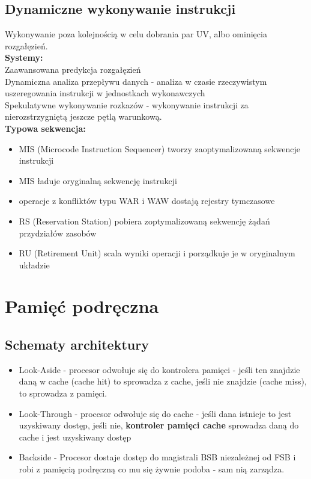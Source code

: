 \documentclass[a4paper]{article}
\begin{document}
\subsection{Dynamiczne wykonywanie instrukcji}
Wykonywanie poza kolejnością w celu dobrania par UV, albo ominięcia rozgałęzień.\\
\textbf{Systemy:}\\
Zaawansowana predykcja rozgałęzień\\
Dynamiczna analiza przepływu danych - analiza w czasie rzeczywistym uszeregowania instrukcji w jednostkach wykonawczych\\
Spekulatywne wykonywanie rozkazów - wykonywanie instrukcji za nierozstrzygniętą jeszcze pętlą warunkową.\\
\textbf{Typowa sekwencja: }\\
\begin{itemize}
\item MIS (Microcode Instruction Sequencer) tworzy zaoptymalizowaną sekwencje instrukcji
\item MIS ładuje oryginalną sekwencję instrukcji
\item operacje z konfliktów typu WAR i WAW dostają rejestry tymczasowe
\item RS (Reservation Station) pobiera zoptymalizowaną sekwencję żądań przydziałów zasobów
\item RU (Retirement Unit) scala wyniki operacji i porządkuje je w oryginalnym układzie
\end{itemize}

\section{Pamięć podręczna}
\subsection{Schematy architektury}
\begin{itemize}
\item Look-Aside - procesor odwołuje się do kontrolera pamięci - jeśli ten znajdzie daną w cache (cache hit) to sprowadza z cache, jeśli nie znajdzie (cache miss), to sprowadza z pamięci.
\item Look-Through - procesor odwołuje się do cache - jeśli dana istnieje to jest uzyskiwany dostęp, jeśli nie, \textbf{kontroler pamięci cache} sprowadza daną do cache i jest uzyskiwany dostęp
\item Backside - Procesor dostaje dostęp do magistrali BSB niezależnej od FSB i robi z pamięcią podręczną co mu się żywnie podoba - sam nią zarządza.
\end{itemize}
\end{document}
